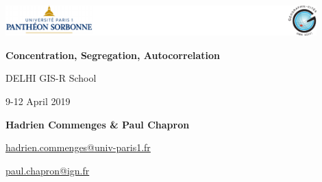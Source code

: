 \graphicspath{{IMAGE/}}

\begin{frame}

\includegraphics[width=12cm]{Logos.pdf}

\vfill

\begin{center}

\vspace*{1.5cm}

\LARGE
\textbf{Concentration, Segregation, Autocorrelation}

\vspace*{1.5cm}
 DELHI GIS-R School


\large
9-12 April 2019

\vspace*{1.5cm}


\textbf{Hadrien Commenges \& Paul Chapron}

{\small

\vspace*{0.1cm}

\url{hadrien.commenges@univ-paris1.fr}

\url{paul.chapron@ign.fr}
}

\end{center}

\end{frame}


